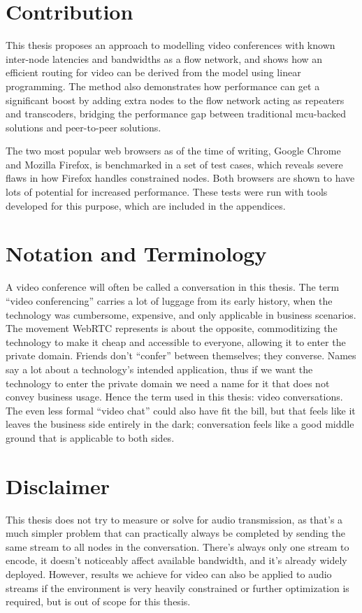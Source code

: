 \section{Contribution}

This thesis proposes an approach to modelling video conferences with known inter-node latencies and bandwidths as a flow network, and shows how an efficient routing for video can be derived from the model using linear programming. The method also demonstrates how performance can get a significant boost by adding extra nodes to the flow network acting as repeaters and transcoders, bridging the performance gap between traditional \gls{mcu}-backed solutions and peer-to-peer solutions.

The two most popular web browsers as of the time of writing, Google Chrome and Mozilla Firefox, is benchmarked in a set of test cases, which reveals severe flaws in how Firefox handles constrained nodes. Both browsers are shown to have lots of potential for increased performance. These tests were run with tools developed for this purpose, which are included in the appendices.


\section{Notation and Terminology}

A video conference will often be called a conversation in this thesis. The term ``video conferencing'' carries a lot of luggage from its early history, when the technology was cumbersome, expensive, and only applicable in business scenarios. The movement WebRTC represents is about the opposite, commoditizing the technology to make it cheap and accessible to everyone, allowing it to enter the private domain. Friends don't ``confer'' between themselves; they converse. Names say a lot about a technology's intended application, thus if we want the technology to enter the private domain we need a name for it that does not convey business usage. Hence the term used in this thesis: video conversations. The even less formal ``video chat'' could also have fit the bill, but that feels like it leaves the business side entirely in the dark; conversation feels like a good middle ground that is applicable to both sides.


\section{Disclaimer}

This thesis does not try to measure or solve for audio transmission, as that's a much simpler problem that can practically always be completed by sending the same stream to all nodes in the conversation. There's always only one stream to encode, it doesn't noticeably affect available bandwidth, and it's already widely deployed. However, results we achieve for video can also be applied to audio streams if the environment is very heavily constrained or further optimization is required, but is out of scope for this thesis.
